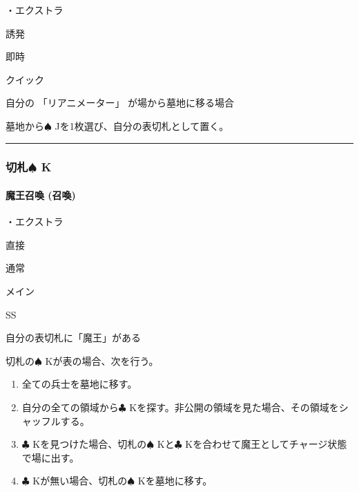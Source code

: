 \documentclass[letterpaper,10pt,dvipdfmx]{sphinxmanual}
\begin{document}
\sphinxAtStartPar
・エクストラ

\sphinxAtStartPar
{} 誘発

\sphinxAtStartPar
{} 即時

\sphinxAtStartPar
{} クイック

\sphinxAtStartPar
{}

\sphinxAtStartPar
自分の 「リアニメーター」 が場から墓地に移る場合

\sphinxAtStartPar
{}

\sphinxAtStartPar
墓地から{\normalsize $\spadesuit$} Jを1枚選び、自分の表切札として置く。


\bigskip\hrule\bigskip



\subsubsection{切札{\normalsize $\spadesuit$} K}
\label{\detokenize{auto/frameActionlist:k}}

\paragraph{魔王召喚 (召喚)}
\label{\detokenize{auto/frameActionlist:act-summondarklord}}\label{\detokenize{auto/frameActionlist:id31}}
\sphinxAtStartPar
{}

\sphinxAtStartPar
・エクストラ

\sphinxAtStartPar
{} 直接

\sphinxAtStartPar
{} 通常

\sphinxAtStartPar
{} メイン

\sphinxAtStartPar
{} SS

\sphinxAtStartPar
{}

\sphinxAtStartPar
自分の表切札に「魔王」がある

\sphinxAtStartPar
{}

\sphinxAtStartPar
切札の{\normalsize $\spadesuit$} Kが表の場合、次を行う。
\begin{enumerate}
%
\item {} 
\sphinxAtStartPar
全ての兵士を墓地に移す。

\item {} 
\sphinxAtStartPar
自分の全ての領域から{\normalsize $\clubsuit$} Kを探す。非公開の領域を見た場合、その領域をシャッフルする。

\item {} 
\sphinxAtStartPar
{\normalsize $\clubsuit$} Kを見つけた場合、切札の{\normalsize $\spadesuit$} Kと{\normalsize $\clubsuit$} Kを合わせて魔王としてチャージ状態で場に出す。

\item {} 
\sphinxAtStartPar
{\normalsize $\clubsuit$} Kが無い場合、切札の{\normalsize $\spadesuit$} Kを墓地に移す。

\end{enumerate}
\end{document}
